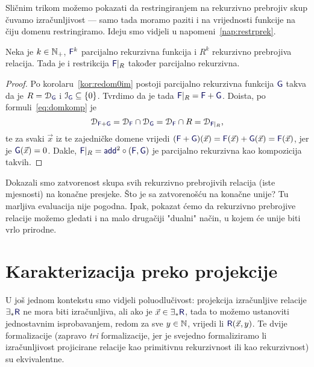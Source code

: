 Sličnim trikom možemo pokazati da restringiranjem na rekurzivno prebrojiv skup čuvamo izračunljivost --- samo tada moramo paziti i na vrijednosti funkcije na čiju domenu restringiramo. Ideju smo vidjeli u napomeni~\ref{nap:restrprek}.

\begin{korolar}[{name=[teorem o restrikciji]}]\label{kor:restre}
Neka je $k\in{\mathbb N}_+$, $\f F^k$ parcijalno rekurzivna funkcija i $R^k$ rekurzivno prebrojiva relacija. Tada je i restrikcija $\f F|_R$ također parcijalno rekurzivna.
\end{korolar}
\begin{proof}
Po korolaru~\ref{kor:redom0im} postoji parcijalno rekurzivna funkcija $\f G$ takva da je $R=\dom{\f G}$ i $\im{\f G}\subseteq\{0\}$. Tvrdimo da je tada $\f F|_R=\f F+\f G$. Doista, po formuli~\eqref{eq:domkomp} je
\begin{equation}
    \dom{\f F+\f G}=\dom{\f F}\cap\dom{\f G}=\dom{\f F}\cap R=\dom{\f F|_R}\text,
\end{equation}
te za svaki $\vec x$ iz te zajedničke domene vrijedi $(\f F+\f G)(\vec x)=\f F(\vec x)+\f G(\vec x)=\f F(\vec x)$, jer je $\f G(\vec x)=0$. Dakle, $\f F|_R=\f{add}^2\circ(\f F,\f G)$ je parcijalno rekurzivna kao kompozicija takvih.
\end{proof}

Dokazali smo zatvorenost skupa svih rekurzivno prebrojivih relacija (iste mjesnosti) na konačne presjeke. Što je sa zatvorenošću na konačne unije? Tu marljiva evaluacija nije pogodna. Ipak, pokazat ćemo da rekurzivno prebrojive relacije možemo gledati i na malo drugačiji "dualni" način, u kojem će unije biti vrlo prirodne.

\section{Karakterizacija preko projekcije}

U još jednom kontekstu smo vidjeli poluodlučivost: projekcija izračunljive relacije $\exists_*\f R$ ne mora biti izračunljiva, ali ako je $\vec x\in\exists_*\f R$, tada to možemo ustanoviti jednostavnim isprobavanjem, redom za sve $y\in{\mathbb N}$, vrijedi li $\f R(\vec x,y)$. Te dvije formalizacije (zapravo \emph{tri} formalizacije, jer je svejedno formaliziramo li izračunljivost projicirane relacije kao primitivnu rekurzivnost ili kao rekurzivnost) su ekvivalentne.

